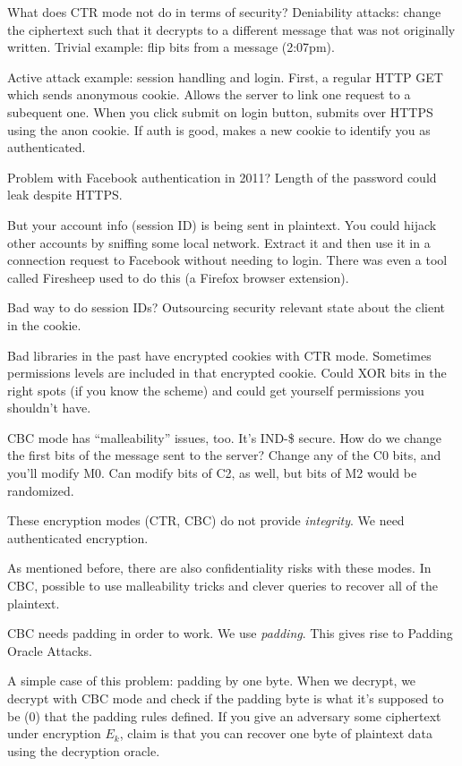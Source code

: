What does CTR mode not do in terms of security? Deniability attacks: change the ciphertext such that it decrypts to a different message that was not originally written. Trivial example: flip bits from a message (2:07pm).

Active attack example: session handling and login. First, a regular HTTP GET which sends anonymous cookie. Allows the server to link one request to a subequent one. When you click submit on login button, submits over HTTPS using the anon cookie. If auth is good, makes a new cookie to identify you as authenticated.

Problem with Facebook authentication in 2011? Length of the password could leak despite HTTPS.

But your account info (session ID) is being sent in plaintext. You could hijack other accounts by sniffing some local network. Extract it and then use it in a connection request to Facebook without needing to login. There was even a tool called Firesheep used to do this (a Firefox browser extension).

Bad way to do session IDs? Outsourcing security relevant state about the client in the cookie. 

Bad libraries in the past have encrypted cookies with CTR mode. Sometimes permissions levels are included in that encrypted cookie. Could XOR bits in the right spots (if you know the scheme) and could get yourself permissions you shouldn't have.



CBC mode has ``malleability'' issues, too. It's IND-\$ secure. How do we change the first bits of the message sent to the server?
Change any of the C0 bits, and you'll modify M0.
Can modify bits of C2, as well, but bits of M2 would be randomized.

These encryption modes (CTR, CBC) do not provide \emph{integrity}. We need authenticated encryption.

As mentioned before, there are also confidentiality risks with these modes. In CBC, possible to use malleability tricks and clever queries to recover all of the plaintext.

CBC needs padding in order to work. We use \emph{padding}. This gives rise to Padding Oracle Attacks.

A simple case of this problem: padding by one byte. When we decrypt, we decrypt with CBC mode and check if the padding byte is what it's supposed to be (0) that the padding rules defined. If you give an adversary some ciphertext under encryption $E_k$, claim is that you can recover one byte of plaintext data using the decryption oracle. 

